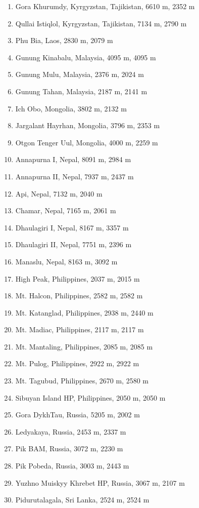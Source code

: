 \documentclass[10pt,twocolumn,letterpaper]{article}
\begin{document}
\begin{flushleft}
\begin{enumerate}
    \item Gora Khurumdy, Kyrgyzstan, Tajikistan, 6610 m, 2352 m
    \item Qullai Istiqlol, Kyrgyzstan, Tajikistan, 7134 m, 2790 m
    \item Phu Bia, Laos, 2830 m, 2079 m
    \item Gunung Kinabalu, Malaysia, 4095 m, 4095 m
    \item Gunung Mulu, Malaysia, 2376 m, 2024 m
    \item Gunung Tahan, Malaysia, 2187 m, 2141 m
    \item Ich Obo, Mongolia, 3802 m, 2132 m
    \item Jargalant Hayrhan, Mongolia, 3796 m, 2353 m
    \item Otgon Tenger Uul, Mongolia, 4000 m, 2259 m
    \item Annapurna I, Nepal, 8091 m, 2984 m
    \item Annapurna II, Nepal, 7937 m, 2437 m
    \item Api, Nepal, 7132 m, 2040 m
    \item Chamar, Nepal, 7165 m, 2061 m
    \item Dhaulagiri I, Nepal, 8167 m, 3357 m
    \item Dhaulagiri II, Nepal, 7751 m, 2396 m
    \item Manaslu, Nepal, 8163 m, 3092 m
    \item High Peak, Philippines, 2037 m, 2015 m
    \item Mt. Halcon, Philippines, 2582 m, 2582 m
    \item Mt. Katanglad, Philippines, 2938 m, 2440 m
    \item Mt. Madiac, Philippines, 2117 m, 2117 m
    \item Mt. Mantaling, Philippines, 2085 m, 2085 m
    \item Mt. Pulog, Philippines, 2922 m, 2922 m
    \item Mt. Tagubud, Philippines, 2670 m, 2580 m
    \item Sibuyan Island HP, Philippines, 2050 m, 2050 m
    \item Gora DykhTau, Russia, 5205 m, 2002 m
    \item Ledyakaya, Russia, 2453 m, 2337 m
    \item Pik BAM, Russia, 3072 m, 2230 m
    \item Pik Pobeda, Russia, 3003 m, 2443 m
    \item Yuzhno Muiskyy Khrebet HP, Russia, 3067 m, 2107 m
    \item Pidurutalagala, Sri Lanka, 2524 m, 2524 m

\end{enumerate}
\end{flushleft}
\end{document}
